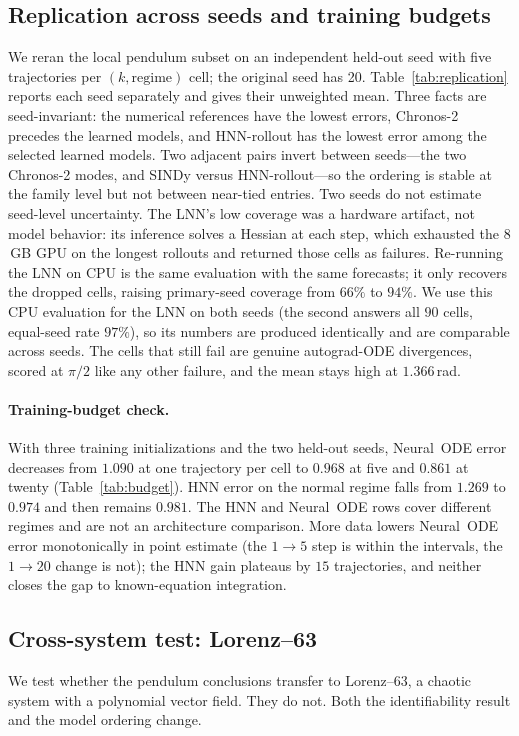 \documentclass{article}
\begin{document}
\subsection{Replication across seeds and training budgets}
\label{sec:replication}
We reran the local pendulum subset on an independent held-out seed with five trajectories per
$(k,\text{regime})$ cell; the original seed has 20. Table~\ref{tab:replication} reports each
seed separately and gives their unweighted mean. Three facts are seed-invariant: the numerical
references have the lowest errors, Chronos-2 precedes the learned models, and HNN-rollout has
the lowest error among the selected learned models. Two adjacent pairs invert between seeds---the
two Chronos-2 modes, and SINDy versus HNN-rollout---so the ordering is stable at the family
level but not between near-tied entries. Two seeds do not estimate seed-level uncertainty. The
LNN's low coverage was a hardware artifact, not model behavior: its
inference solves a Hessian at each step, which exhausted the $8$\,GB GPU on the longest
rollouts and returned those cells as failures. Re-running the LNN on CPU is the same evaluation
with the same forecasts; it only recovers the dropped cells, raising primary-seed coverage from
$66\%$ to $94\%$. We use this CPU evaluation for the LNN on both seeds (the second answers all
$90$ cells, equal-seed rate $97\%$), so its numbers are produced identically and are comparable
across seeds. The cells that still fail are genuine autograd-ODE divergences, scored at $\pi/2$
like any other failure, and the mean stays high at $1.366$\,rad.

\paragraph{Training-budget check.}
With three training initializations and the two held-out seeds, Neural~ODE error decreases
from $1.090$ at one trajectory per cell to $0.968$ at five and $0.861$ at twenty
(Table~\ref{tab:budget}). HNN error on the normal regime falls from $1.269$ to $0.974$ and
then remains $0.981$. The HNN and Neural~ODE rows cover different regimes and are not an
architecture comparison. More data lowers Neural~ODE error monotonically in point estimate
(the $1\!\to\!5$ step is within the intervals, the $1\!\to\!20$ change is not); the HNN gain
plateaus by $15$ trajectories, and neither closes the gap to known-equation integration.

\subsection{Cross-system test: Lorenz--63}
\label{sec:lorenz}
We test whether the pendulum conclusions transfer to Lorenz--63, a chaotic system with a
polynomial vector field. They do not. Both the identifiability result and the model ordering
change.
\end{document}
